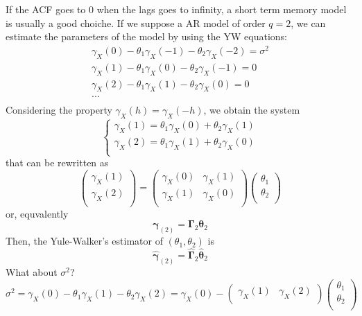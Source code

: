 If the ACF goes to 0 when the lags goes to infinity, a short term memory model is usually a good choiche. If we suppose a AR model of order $q=2$, we can estimate the parameters of the model by using the YW equations:
\begin{equation*}
    \begin{split}
        \gamma_X(0)-\theta_1\gamma_X(-1)-\theta_2\gamma_X(-2)=\sigma^2\\
        \gamma_X(1)-\theta_1\gamma_X(0)-\theta_2\gamma_X(-1)=0\\
        \gamma_X(2)-\theta_1\gamma_X(1)-\theta_2\gamma_X(0)=0\\
        ...\\
    \end{split}
\end{equation*}
Considering the property $\gamma_X(h)=\gamma_X(-h)$, we obtain the system
\[
    \begin{cases}
        \gamma_X(1)=\theta_1\gamma_X(0)+\theta_2\gamma_X(1)\\
        \gamma_X(2)=\theta_1\gamma_X(1)+\theta_2\gamma_X(0)\\
    \end{cases}
\]
that can be rewritten as
\[
    \begin{pmatrix}
        \gamma_X(1)\\
        \gamma_X(2)\\
    \end{pmatrix}  
    =
    \begin{pmatrix}
        \gamma_X(0)&\gamma_X(1)\\
        \gamma_X(1)&\gamma_X(0)\\
    \end{pmatrix}
    \begin{pmatrix}
        \theta_1\\
        \theta_2\\
    \end{pmatrix}
\]
or, equvalently
\[
    \boldsymbol{\gamma}_{(2)}=\boldsymbol{\Gamma}_2\boldsymbol{\theta}_2  
\]
Then, the Yule-Walker's estimator of $(\theta_1,\theta_2)$ is
\[
    \hat{\boldsymbol{\gamma}}_{(2)}=\hat{\boldsymbol{\Gamma}}_2\hat{\boldsymbol{\theta}}_2 
\]
What about $\sigma^2$?
\[
    \sigma^2=\gamma_X(0)-\theta_1\gamma_X(1)-\theta_2\gamma_X(2)=\gamma_X(0)-
    \begin{pmatrix}
        \gamma_X(1)&\gamma_X(2)\\
    \end{pmatrix}
    \begin{pmatrix}
        \theta_1\\
        \theta_2\\
    \end{pmatrix}
\]
